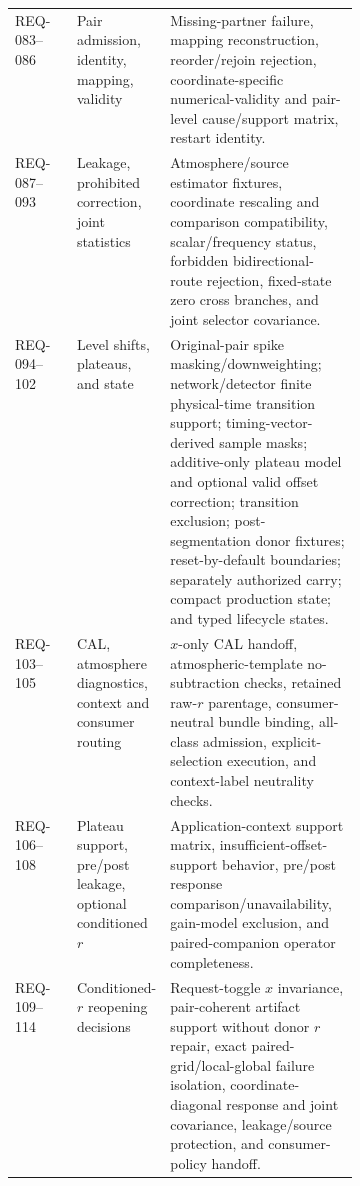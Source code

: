 \documentclass[10pt]{article}
\begin{document}
\begin{tabularx}{\linewidth}{@{}p{0.18\linewidth}p{0.22\linewidth}X@{}}
REQ-083--086 & Pair admission, identity, mapping, validity & Missing-partner failure, mapping reconstruction, reorder/rejoin rejection, coordinate-specific numerical-validity and pair-level cause/support matrix, restart identity. \\
REQ-087--093 & Leakage, prohibited correction, joint statistics & Atmosphere/source estimator fixtures, coordinate rescaling and comparison compatibility, scalar/frequency status, forbidden bidirectional-route rejection, fixed-state zero cross branches, and joint selector covariance. \\
REQ-094--102 & Level shifts, plateaus, and state & Original-pair spike masking/downweighting; network/detector finite physical-time transition support; timing-vector-derived sample masks; additive-only plateau model and optional valid offset correction; transition exclusion; post-segmentation donor fixtures; reset-by-default boundaries; separately authorized carry; compact production state; and typed lifecycle states. \\
REQ-103--105 & CAL, atmosphere diagnostics, context and consumer routing & $x$-only CAL handoff, atmospheric-template no-subtraction checks, retained raw-$r$ parentage, consumer-neutral bundle binding, all-class admission, explicit-selection execution, and context-label neutrality checks. \\
REQ-106--108 & Plateau support, pre/post leakage, optional conditioned $r$ & Application-context support matrix, insufficient-offset-support behavior, pre/post response comparison/unavailability, gain-model exclusion, and paired-companion operator completeness. \\
REQ-109--114 & Conditioned-$r$ reopening decisions & Request-toggle $x$ invariance, pair-coherent artifact support without donor $r$ repair, exact paired-grid/local-global failure isolation, coordinate-diagonal response and joint covariance, leakage/source protection, and consumer-policy handoff. \\
\bottomrule
\end{tabularx}
\normalsize
\end{document}
